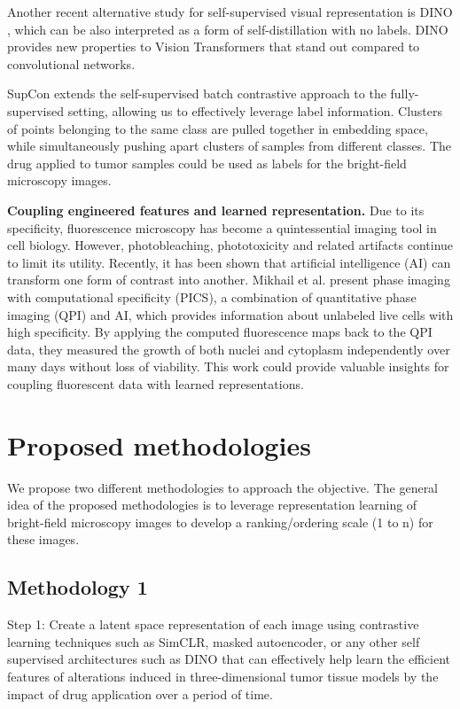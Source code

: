 \documentclass[12pt,twoside,a4paper,parskip]{scrbook} %
\begin{document}
Another recent alternative study for self-supervised visual representation is DINO \cite{caron2021emerging}, which can be also interpreted as a form of self-distillation with no labels. DINO provides new properties to Vision Transformers that stand out compared to convolutional networks.

SupCon \cite{khosla2021supervised} extends the self-supervised batch contrastive approach to the fully-supervised setting, allowing us to effectively leverage label information. Clusters of points belonging to the same class are pulled together in embedding space, while simultaneously pushing apart clusters of samples from different classes. The drug applied to tumor samples could be used as labels for the bright-field microscopy images.

\textbf{Coupling engineered features and learned representation.}  
Due to its specificity, fluorescence microscopy has become a quintessential imaging tool in cell biology. However, photobleaching, phototoxicity and related artifacts continue to limit its utility. Recently, it has been shown that artificial intelligence (AI) can transform one form of contrast into another. Mikhail et al.\cite{Kandel_2020} present phase imaging with computational specificity (PICS), a combination of quantitative phase imaging (QPI) and AI, which provides information about unlabeled live cells with high specificity. By applying the computed fluorescence maps back to the QPI data, they measured the growth of both nuclei and cytoplasm independently over many days without loss of viability. This work could provide valuable insights for coupling fluorescent data with learned representations.

\let\cleardoublepage\clearpage
\chapter{Proposed methodologies}\label{ch:Proposed methodologies}
We propose two different methodologies to approach the objective. The general idea of the proposed methodologies is to leverage representation learning of bright-field microscopy images to develop a ranking/ordering scale (1 to n) for these images. 

\section{Methodology 1}
Step 1: Create a latent space representation of each image using contrastive learning techniques such as SimCLR, masked autoencoder, or any other self supervised architectures such as DINO that can effectively help learn the efficient features of alterations induced in three-dimensional tumor tissue models by the impact of drug application over a period of time.
\end{document}
